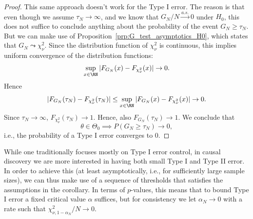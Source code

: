 \begin{proof}
This same approach doesn't work for the Type I error. The reason is that even though
we assume $\tau_N \to \infty$, and we know that $G_N / N \stackrel{a.s.}{\to} 0$ 
under $H_0$,
this does not suffice to conclude anything about the probability of the event 
$G_N \ge \tau_N$. But we can make use of Proposition~\ref{prp:G_test_asymptotics_H0},
which states that $G_N \leadsto \chi_{\nu}^2$. 
Since the distribution function of $\chi_{\nu}^2$ is continuous,
this implies uniform convergence of the distribution functions:
  $$\sup_{x \in \RN} |F_{G_N}(x) - F_{\chi_{\nu}^2}(x)| \to 0.$$
Hence
  $$|F_{G_N}(\tau_N) - F_{\chi_{\nu}^2}(\tau_N)| \le \sup_{x\in\RN} |F_{G_N}(x) - F_{\chi_{\nu}^2}(x)| \to 0.$$
Since $\tau_N \to \infty$, $F_{\chi_{\nu}^2}(\tau_N) \to 1$.
Hence, also $F_{G_N}(\tau_N) \to 1$.
We conclude that 
  $$\theta \in \Theta_0 \implies P(G_N \ge \tau_N) \to 0,$$
i.e., the probability of a Type I error converges to 0.
\end{proof}

While one traditionally focuses mostly on Type I error control, in causal discovery we
are more interested in having both small Type I and Type II error. In order to achieve this
(at least asymptotically, i.e., for sufficiently large sample sizes), we can thus make use of a sequence of
thresholds that satisfies the assumptions in the corollary. In terms of $p$-values, this means
that to bound Type I error a fixed critical value $\alpha$ suffices, but for consistency we
let $\alpha_N \to 0$ with a rate such that $\chi^2_{\nu,1-\alpha_N} / N \to 0$.

